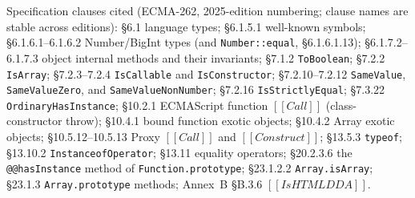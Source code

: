 \documentclass[11pt]{article}
\newcommand{\intm}[1]{[[#1]]}
\begin{document}
Specification clauses cited (ECMA-262, 2025-edition numbering; clause
names are stable across editions): \S6.1 language types; \S6.1.5.1
well-known symbols; \S6.1.6.1--6.1.6.2 Number/BigInt types (and
\texttt{Number::equal}, \S6.1.6.1.13); \S6.1.7.2--6.1.7.3 object
internal methods and their invariants; \S7.1.2 \texttt{ToBoolean};
\S7.2.2 \texttt{IsArray}; \S7.2.3--7.2.4 \texttt{IsCallable} and
\texttt{IsConstructor}; \S7.2.10--7.2.12 \texttt{SameValue},
\texttt{SameValueZero}, and \texttt{SameValueNonNumber};
\S7.2.16 \texttt{IsStrictlyEqual}; \S7.3.22
\texttt{OrdinaryHasInstance}; \S10.2.1 ECMAScript function
$\intm{Call}$ (class-constructor throw); \S10.4.1 bound function exotic
objects; \S10.4.2 Array exotic objects; \S10.5.12--10.5.13 Proxy
$\intm{Call}$ and $\intm{Construct}$; \S13.5.3 \texttt{typeof};
\S13.10.2 \texttt{InstanceofOperator}; \S13.11 equality operators;
\S20.2.3.6 the \texttt{@@hasInstance} method of
\texttt{Function.prototype}; \S23.1.2.2
\texttt{Array.isArray}; \S23.1.3 \texttt{Array.prototype} methods;
Annex~B \S B.3.6 $\intm{IsHTMLDDA}$.
\end{document}
